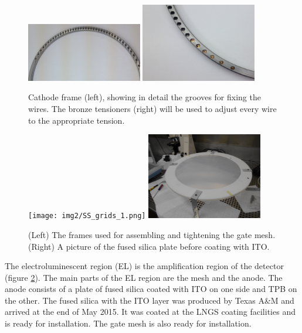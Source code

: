 \begin{figure}[hpt!]
\centering
\includegraphics[width=0.45\textwidth]{img2/cathode_1.png}
\includegraphics[width=0.45\textwidth]{img2/cathode_tensioners.png}
\caption{Cathode frame (left), showing in detail the grooves for fixing the wires. The bronze tensioners (right) will be used to adjust every wire to the appropriate tension.} \label{fig:cath}
\end{figure}

\begin{figure}[hpt!]
\centering
\texttt{[image: img2/SS\_grids\_1.png]}
\includegraphics[width=0.45\textwidth]{img2/Anode_coated.png}
\caption{(Left) The frames used for assembling and tightening the gate mesh. (Right)  A picture of the fused silica plate before coating with ITO.} \label{fig:el}
\end{figure}

The electroluminescent region (EL) is the amplification region of the detector (figure \ref{fig:el}).  The main parts of the EL region are the mesh and the anode. The anode consists of a plate of fused silica coated with ITO on one side and TPB on the other. The fused silica with the ITO layer was produced by Texas A\&M and arrived at the end of May 2015. It was coated at the LNGS coating facilities and is ready for installation. The gate mesh is also ready for installation.




